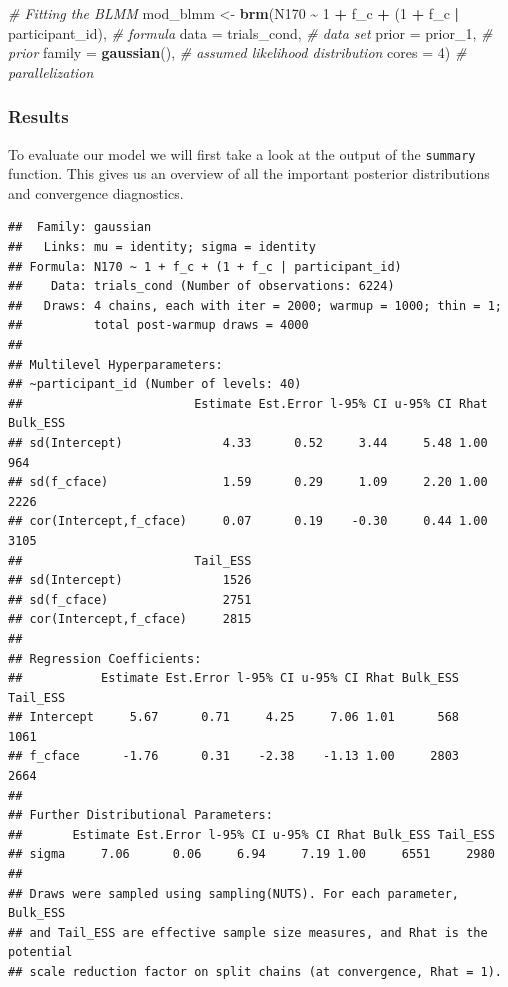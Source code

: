 \documentclass[
  doc,12pt,floatsintext]{apa7}
\newenvironment{Shaded}{\begin{snugshade}}{\end{snugshade}}
\newcommand{\AttributeTok}[1]{\textcolor[rgb]{0.13,0.29,0.53}{#1}}
\newcommand{\CommentTok}[1]{\textcolor[rgb]{0.56,0.35,0.01}{\textit{#1}}}
\newcommand{\DecValTok}[1]{\textcolor[rgb]{0.00,0.00,0.81}{#1}}
\newcommand{\FunctionTok}[1]{\textcolor[rgb]{0.13,0.29,0.53}{\textbf{#1}}}
\newcommand{\NormalTok}[1]{#1}
\newcommand{\OtherTok}[1]{\textcolor[rgb]{0.56,0.35,0.01}{#1}}
\newcommand{\SpecialCharTok}[1]{\textcolor[rgb]{0.81,0.36,0.00}{\textbf{#1}}}
\begin{document}
\begin{Shaded}
\begin{Highlighting}[]
\CommentTok{\# Fitting the BLMM}
\NormalTok{mod\_blmm }\OtherTok{\textless{}{-}} \FunctionTok{brm}\NormalTok{(N170 }\SpecialCharTok{\textasciitilde{}} \DecValTok{1} \SpecialCharTok{+}\NormalTok{ f\_c }\SpecialCharTok{+}\NormalTok{ (}\DecValTok{1} \SpecialCharTok{+}\NormalTok{ f\_c }\SpecialCharTok{|}\NormalTok{ participant\_id), }\CommentTok{\# formula}
                \AttributeTok{data =}\NormalTok{ trials\_cond, }\CommentTok{\# data set}
                \AttributeTok{prior =}\NormalTok{ prior\_1, }\CommentTok{\# prior}
                \AttributeTok{family =} \FunctionTok{gaussian}\NormalTok{(), }\CommentTok{\# assumed likelihood distribution}
                \AttributeTok{cores =} \DecValTok{4}\NormalTok{) }\CommentTok{\# parallelization}
\end{Highlighting}
\end{Shaded}

\subsubsection{Results}\label{results-1}

To evaluate our model we will first take a look at the output of the \texttt{summary} function. This gives us an overview of all the important posterior distributions and convergence diagnostics.




\begin{verbatim}
##  Family: gaussian 
##   Links: mu = identity; sigma = identity 
## Formula: N170 ~ 1 + f_c + (1 + f_c | participant_id) 
##    Data: trials_cond (Number of observations: 6224) 
##   Draws: 4 chains, each with iter = 2000; warmup = 1000; thin = 1;
##          total post-warmup draws = 4000
## 
## Multilevel Hyperparameters:
## ~participant_id (Number of levels: 40) 
##                        Estimate Est.Error l-95% CI u-95% CI Rhat Bulk_ESS
## sd(Intercept)              4.33      0.52     3.44     5.48 1.00      964
## sd(f_cface)                1.59      0.29     1.09     2.20 1.00     2226
## cor(Intercept,f_cface)     0.07      0.19    -0.30     0.44 1.00     3105
##                        Tail_ESS
## sd(Intercept)              1526
## sd(f_cface)                2751
## cor(Intercept,f_cface)     2815
## 
## Regression Coefficients:
##           Estimate Est.Error l-95% CI u-95% CI Rhat Bulk_ESS Tail_ESS
## Intercept     5.67      0.71     4.25     7.06 1.01      568     1061
## f_cface      -1.76      0.31    -2.38    -1.13 1.00     2803     2664
## 
## Further Distributional Parameters:
##       Estimate Est.Error l-95% CI u-95% CI Rhat Bulk_ESS Tail_ESS
## sigma     7.06      0.06     6.94     7.19 1.00     6551     2980
## 
## Draws were sampled using sampling(NUTS). For each parameter, Bulk_ESS
## and Tail_ESS are effective sample size measures, and Rhat is the potential
## scale reduction factor on split chains (at convergence, Rhat = 1).
\end{verbatim}
\end{document}
